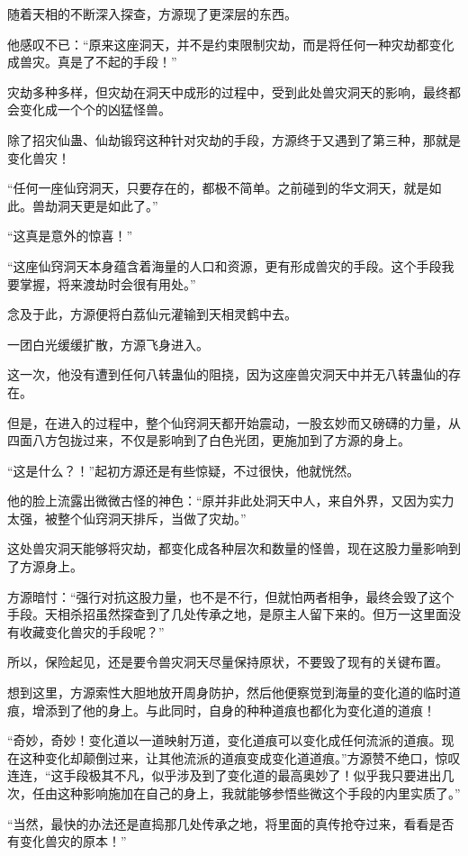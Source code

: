 \begin{this_body}
随着天相的不断深入探查，方源现了更深层的东西。

他感叹不已：“原来这座洞天，并不是约束限制灾劫，而是将任何一种灾劫都变化成兽灾。真是了不起的手段！”

灾劫多种多样，但灾劫在洞天中成形的过程中，受到此处兽灾洞天的影响，最终都会变化成一个个的凶猛怪兽。

除了招灾仙蛊、仙劫锻窍这种针对灾劫的手段，方源终于又遇到了第三种，那就是变化兽灾！

“任何一座仙窍洞天，只要存在的，都极不简单。之前碰到的华文洞天，就是如此。兽劫洞天更是如此了。”

“这真是意外的惊喜！”

“这座仙窍洞天本身蕴含着海量的人口和资源，更有形成兽灾的手段。这个手段我要掌握，将来渡劫时会很有用处。”

念及于此，方源便将白荔仙元灌输到天相灵鹤中去。

一团白光缓缓扩散，方源飞身进入。

这一次，他没有遭到任何八转蛊仙的阻挠，因为这座兽灾洞天中并无八转蛊仙的存在。

但是，在进入的过程中，整个仙窍洞天都开始震动，一股玄妙而又磅礴的力量，从四面八方包拢过来，不仅是影响到了白色光团，更施加到了方源的身上。

“这是什么？！”起初方源还是有些惊疑，不过很快，他就恍然。

他的脸上流露出微微古怪的神色：“原并非此处洞天中人，来自外界，又因为实力太强，被整个仙窍洞天排斥，当做了灾劫。”

这处兽灾洞天能够将灾劫，都变化成各种层次和数量的怪兽，现在这股力量影响到了方源身上。

方源暗忖：“强行对抗这股力量，也不是不行，但就怕两者相争，最终会毁了这个手段。天相杀招虽然探查到了几处传承之地，是原主人留下来的。但万一这里面没有收藏变化兽灾的手段呢？”

所以，保险起见，还是要令兽灾洞天尽量保持原状，不要毁了现有的关键布置。

想到这里，方源索性大胆地放开周身防护，然后他便察觉到海量的变化道的临时道痕，增添到了他的身上。与此同时，自身的种种道痕也都化为变化道的道痕！

“奇妙，奇妙！变化道以一道映射万道，变化道痕可以变化成任何流派的道痕。现在这种变化却颠倒过来，让其他流派的道痕变成变化道道痕。”方源赞不绝口，惊叹连连，“这手段极其不凡，似乎涉及到了变化道的最高奥妙了！似乎我只要进出几次，任由这种影响施加在自己的身上，我就能够参悟些微这个手段的内里实质了。”

“当然，最快的办法还是直捣那几处传承之地，将里面的真传抢夺过来，看看是否有变化兽灾的原本！”


\end{this_body}
